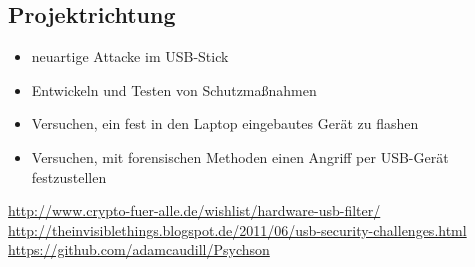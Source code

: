 \documentclass[
a4paper, %
twoside%
]{article}
\begin{document}


\subsection{Projektrichtung}
\begin{itemize}
\item neuartige Attacke im USB-Stick
\item Entwickeln und Testen von Schutzmaßnahmen
\item Versuchen, ein fest in den Laptop eingebautes Gerät zu flashen
\item Versuchen, mit forensischen Methoden einen Angriff per USB-Gerät
  festzustellen
\end{itemize}
\url{http://www.crypto-fuer-alle.de/wishlist/hardware-usb-filter/}
\url{http://theinvisiblethings.blogspot.de/2011/06/usb-security-challenges.html}
\url{https://github.com/adamcaudill/Psychson}
\end{document}
